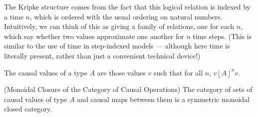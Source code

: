 \documentclass{article}
\newcommand{\Approx}[2][n]{\left\lfloor{#2}\right\rfloor^{#1}}
\begin{document}
The Kripke structure comes from the fact that this logical relation is
indexed by a time $n$, which is ordered with the usual ordering on
natural numbers. Intuitively, we can think of this as giving a family
of relations, one for each $n$, which say whether two values
approximate one another for $n$ time steps. (This is similar to the use of 
time in step-indexed models --- although here time is literally present, rather 
than just a convenient technical device!)

The causal values of a type $A$ are those values $v$ such that for all
$n$, $v \Approx{A} v$.

\begin{theorem}{(Monoidal Closure of the Category of Causal Operations)}
The category of sets of causal values of type $A$ and causal maps
between them is a symmetric monoidal closed category.
\end{theorem}
\end{document}
